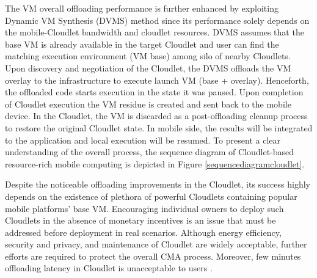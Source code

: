 \documentclass[publish]{IEEEtran}
\begin{document}
\begin{itemize}
The VM overall offloading performance is further enhanced by exploiting Dynamic VM Synthesis (DVMS) method since its performance solely depends on the mobile-Cloudlet bandwidth and cloudlet resources. DVMS assumes that the base VM is already available in the target Cloudlet and user can find the matching execution environment (VM base) among silo of nearby Cloudlets. Upon discovery and negotiation of the Cloudlet, the DVMS offloads the VM overlay to the infrastructure to execute launch VM (base + overlay). Henceforth, the offloaded code starts execution in the state it was paused. Upon completion of Cloudlet execution the VM residue is created and sent back to the mobile device. In the Cloudlet, the VM is discarded as a post-offloading cleanup process to restore the original Cloudlet state. In mobile side, the results will be integrated to the application and local execution will be resumed. To present a clear understanding of the overall process, the sequence diagram of Cloudlet-based resource-rich mobile computing is depicted in Figure \ref{sequencediagramcloudlet}.

Despite the noticeable offloading improvements in the Cloudlet, its success highly depends on the existence of plethora of powerful Cloudlets containing popular mobile platforms' base VM. Encouraging individual owners to deploy such Cloudlets in the absence of monetary incentives is an issue that must be addressed before deployment in real scenarios. Although energy efficiency, security and privacy, and maintenance of Cloudlet are widely acceptable, further efforts are required to protect the overall CMA process. Moreover, few minutes offloading latency in Cloudlet is unacceptable to users \cite{Tolia2006}.

\end{itemize}
\end{document}
